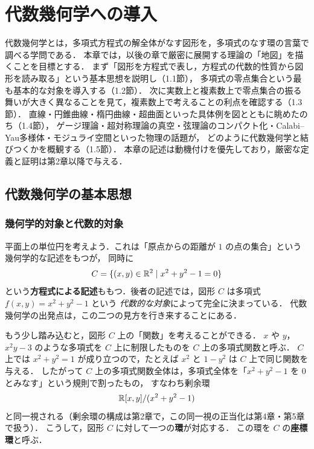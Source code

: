 \chapter{代数幾何学への導入}\label{ch:ch01}

\begin{chapterlead}
代数幾何学とは，多項式方程式の解全体がなす図形を，多項式のなす環の言葉で調べる学問である．
本章では，以後の章で厳密に展開する理論の「地図」を描くことを目標とする．
まず「図形を方程式で表し，方程式の代数的性質から図形を読み取る」という基本思想を説明し（1.1節），
多項式の零点集合という最も基本的な対象を導入する（1.2節）．
次に実数上と複素数上で零点集合の振る舞いが大きく異なることを見て，複素数上で考えることの利点を確認する（1.3節）．
直線・円錐曲線・楕円曲線・超曲面といった具体例を図とともに眺めたのち（1.4節），
ゲージ理論・超対称理論の真空・弦理論のコンパクト化・Calabi--Yau多様体・モジュライ空間といった物理の話題が，
どのように代数幾何学と結びつくかを概観する（1.5節）．
本章の記述は動機付けを優先しており，厳密な定義と証明は第2章以降で与える．
\end{chapterlead}

\section{代数幾何学の基本思想}

\subsection{幾何学的対象と代数的対象}

平面上の単位円を考えよう．これは「原点からの距離が $1$ の点の集合」という幾何学的な記述をもつが，
同時に
\[
  C=\{(x,y)\in\mathbb{R}^2 \mid x^2+y^2-1=0\}
\]
という\textbf{方程式による記述}ももつ．後者の記述では，図形 $C$ は多項式 $f(x,y)=x^2+y^2-1$ という
\emph{代数的な対象}によって完全に決まっている．
代数幾何学の出発点は，この二つの見方を行き来することにある．

もう少し踏み込むと，図形 $C$ 上の「関数」を考えることができる．
$x$ や $y$，$x^2y-3$ のような多項式を $C$ 上に制限したものを $C$ 上の多項式関数と呼ぶ．
$C$ 上では $x^2+y^2=1$ が成り立つので，たとえば $x^2$ と $1-y^2$ は $C$ 上で同じ関数を与える．
したがって $C$ 上の多項式関数全体は，多項式全体を「$x^2+y^2-1$ を $0$ とみなす」という規則で割ったもの，
すなわち剰余環
\[
  \mathbb{R}[x,y]/(x^2+y^2-1)
\]
と同一視される（剰余環の構成は第2章で，この同一視の正当化は第4章・第5章で扱う）．
こうして，図形 $C$ に対して一つの\textbf{環}が対応する．
この環を $C$ の\textbf{座標環}と呼ぶ．

